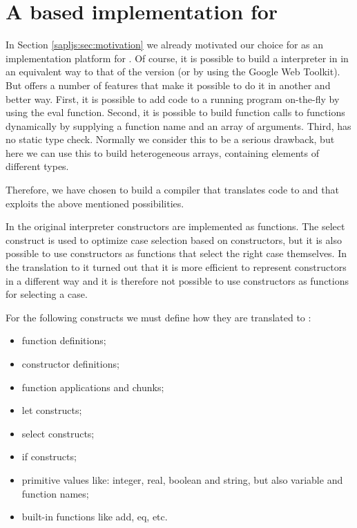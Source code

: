 \section{A \JS based implementation for  \Sapl}\label{sapljs:sec:sapljs}
In Section \ref{sapljs:sec:motivation} we already motivated our choice for \JS as an implementation platform for \Sapl.
Of course, it is possible to build a \Sapl interpreter in \JS in an equivalent way to that of the \Java version (or by using the Google Web Toolkit).
But \JS offers a number of features that make it possible to do it in another and better way.
First, it is possible to add \JS code to a running \JS program on-the-fly by using the \textsf{eval} function.
Second, it is possible to build function calls to \JS functions dynamically by supplying a function name and an array of arguments.
Third, \JS has no static type check. Normally we consider this to be a serious drawback, but here we can use this to build heterogeneous arrays,
containing elements of different types.

Therefore, we have chosen to build a compiler that translates \Sapl code to \JS and that exploits the above mentioned possibilities.

In the original \Sapl interpreter constructors are implemented as functions.
The \textsf{select} construct is used to optimize case selection based on constructors,
but it is also possible to use constructors as functions that select the right case themselves.
In the translation to \JS it turned out that it is more efficient to represent constructors in 
a different way and it is therefore not possible to use constructors as functions for selecting a case. 

For the following \Sapl constructs we must define how they are translated to \JS:
\begin{itemize}
	\item function definitions;
	\item constructor definitions;
	\item function applications and chunks;
	\item let constructs;
	\item select constructs;
	\item if constructs;
	\item primitive values like: integer, real, boolean and string, but also variable and function names;
	\item built-in functions like add, eq, etc.
\end{itemize}

